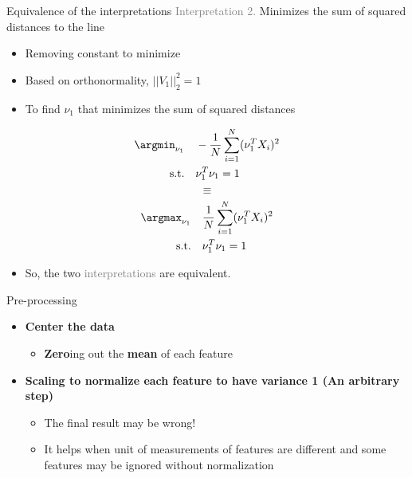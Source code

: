 \documentclass[serif, aspectratio=169]{beamer}
\begin{document}
\begin{frame}{Equivalence of the interpretations}
    \textcolor{gray}{Interpretation 2.} Minimizes the sum of squared distances to the line\\[0.2cm]
    \begin{itemize}
        \item Removing constant to minimize
        \item Based on orthonormality, $||V_1||_2^2 = 1$
        \item To find $\nu_1$ that minimizes the sum of squared distances
    \end{itemize}
    \vspace{0.2cm}
    $$\begin{aligned}
            \argmin_{\nu_1} \quad & -\frac{1}{N} \sum_{i=1}^{N} (\nu_1^T X_i)^2\\
            \textrm{s.t.} \quad & \nu_1^T\nu_1 = 1\\
        \end{aligned}$$
    \endminipage
    \hfill
    $$\equiv$$
    \endminipage
    \hfill
    $$\begin{aligned}
            \argmax_{\nu_1} \quad & \frac{1}{N} \sum_{i=1}^{N} (\nu_1^T X_i)^2\\
            \textrm{s.t.} \quad & \nu_1^T\nu_1 = 1\\
        \end{aligned}$$
    \endminipage
    \vspace{0.5cm}
    \begin{itemize}
        \item So, the two \textcolor{gray}{interpretations} are equivalent.
    \end{itemize} 
\end{frame}

\begin{frame}{Pre-processing}
    \begin{itemize}
        \item \textbf{Center the data}
            \begin{itemize}
                \item \textbf{Zero}ing out the \textbf{mean} of each feature\\
            \end{itemize}
            
        \item \textbf{Scaling to normalize each feature to have variance 1 (An arbitrary step)}
            \begin{itemize}
                \item The final result may be wrong!
                \item It helps when unit of measurements of features are different and some features may be ignored without normalization
            \end{itemize}
    \end{itemize}
\end{frame}
\end{document}
